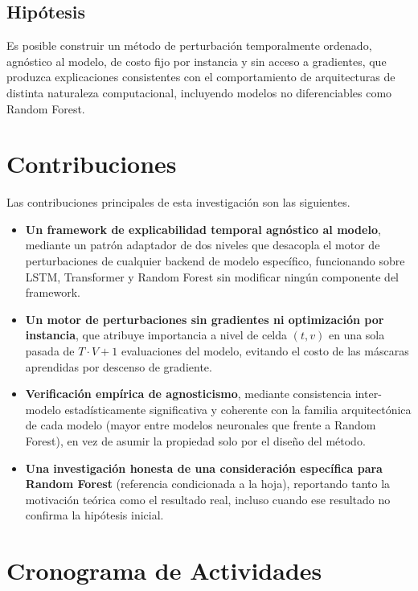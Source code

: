 \subsection{Hipótesis}
Es posible construir un método de perturbación temporalmente ordenado, agnóstico al modelo, de costo fijo por instancia y sin acceso a gradientes, que produzca explicaciones consistentes con el comportamiento de arquitecturas de distinta naturaleza computacional, incluyendo modelos no diferenciables como Random Forest.

\section{Contribuciones}

Las contribuciones principales de esta investigación son las siguientes.

\begin{itemize}
    \item \textbf{Un framework de explicabilidad temporal agnóstico al modelo}, mediante un patrón adaptador de dos niveles que desacopla el motor de perturbaciones de cualquier backend de modelo específico, funcionando sobre LSTM, Transformer y Random Forest sin modificar ningún componente del framework.
    \item \textbf{Un motor de perturbaciones sin gradientes ni optimización por instancia}, que atribuye importancia a nivel de celda $(t,v)$ en una sola pasada de $T{\cdot}V{+}1$ evaluaciones del modelo, evitando el costo de las máscaras aprendidas por descenso de gradiente.
    \item \textbf{Verificación empírica de agnosticismo}, mediante consistencia inter-modelo estadísticamente significativa y coherente con la familia arquitectónica de cada modelo (mayor entre modelos neuronales que frente a Random Forest), en vez de asumir la propiedad solo por el diseño del método.
    \item \textbf{Una investigación honesta de una consideración específica para Random Forest} (referencia condicionada a la hoja), reportando tanto la motivación teórica como el resultado real, incluso cuando ese resultado no confirma la hipótesis inicial.
\end{itemize}

\section{Cronograma de Actividades}

